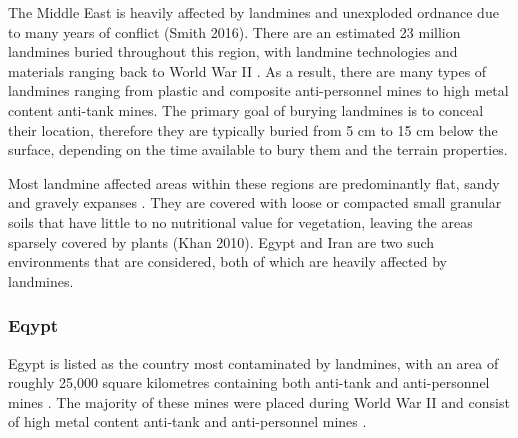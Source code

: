 \documentclass[main.tex]{subfiles}
\begin{document}
The Middle East is heavily affected by landmines and unexploded ordnance due to many years of conflict (Smith 2016). There are an estimated 23 million landmines buried throughout this region, with landmine technologies and materials ranging back to World War II \parencite{Khamis13}. As a result, there are many types of landmines ranging from plastic and composite anti-personnel mines to high metal content anti-tank mines. The primary goal of burying landmines is to conceal their location, therefore they are typically buried from 5 cm to 15 cm below the surface, depending on the time available to bury them and the terrain properties.

Most landmine affected areas within these regions are predominantly flat, sandy and gravely expanses \parencite{Nahrawy2011}. They are covered with loose or compacted small granular soils that have little to no nutritional value for vegetation, leaving the areas sparsely covered by plants (Khan 2010).  
Egypt and Iran are two such environments that are considered, both of which are heavily affected by landmines.  %

\subsubsection{Eqypt}


Egypt is listed as the country most contaminated by landmines, with an area of roughly 25,000 square kilometres containing both anti-tank and anti-personnel mines \parencite{Rushfan2008}. The majority of these mines were placed during World War II and consist of high metal content anti-tank and anti-personnel mines \parencite{Khamis13}. %
\end{document}
